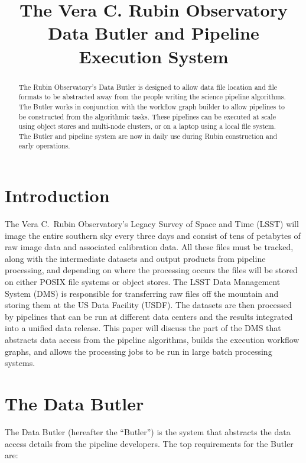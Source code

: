 \documentclass[]{spie}
\title{The Vera C. Rubin Observatory Data Butler and Pipeline Execution System}
\begin{document}
\maketitle

\begin{abstract}
    The Rubin Observatory's Data Butler is designed to allow data file location and file formats to be abstracted away from the people writing the science pipeline algorithms.
    The Butler works in conjunction with the workflow graph builder to allow pipelines to be constructed from the algorithmic tasks.
    These pipelines can be executed at scale using object stores and multi-node clusters, or on a laptop using a local file system.
    The Butler and pipeline system are now in daily use during Rubin construction and early operations.
\end{abstract}


\section{Introduction}

The Vera C.\ Rubin Observatory's Legacy Survey of Space and Time (LSST) \cite{2019ApJ...873..111I} will image the entire southern sky every three days and consist of tens of petabytes of raw image data and associated calibration data.
All these files must be tracked, along with the intermediate datasets and output products from pipeline processing, and depending on where the processing occurs the files will be stored on either POSIX file systems or object stores.
The LSST Data Management System (DMS)\cite{2017ASPC..512..279J} is responsible for transferring raw files off the mountain and storing them at the US Data Facility (USDF).
The datasets are then processed by pipelines\cite{2019ASPC..523..521B,2018PASJ...70S...5B} that can be run at different data centers and the results integrated into a unified data release.
This paper will discuss the part of the DMS that abstracts data access from the pipeline algorithms, builds the execution workflow graphs, and allows the processing jobs to be run in large batch processing systems.

\section{The Data Butler}

The Data Butler (hereafter the ``Butler'') is the system that abstracts the data access details from the pipeline developers.
The top requirements for the Butler are:
\end{document}
